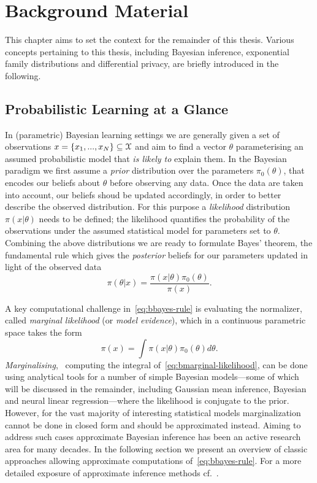 \chapter{Background Material}
\label{chap:chap2}

This chapter aims to set the context for the remainder of this thesis. Various concepts pertaining to this thesis, including Bayesian inference, exponential family distributions and differential privacy, are briefly introduced in the following.

\section{Probabilistic Learning at  a Glance}
\label{sec:b-bayesian-inference}

In (parametric) Bayesian learning settings we are generally given a set of observations $x = \{x_1,...,x_N\} \subseteq \mathcal{X}$ and aim to find a vector $\theta $ parameterising an assumed probabilistic model that \emph{is likely to} explain them. In the Bayesian paradigm we first assume a \emph{prior} distribution over the parameters $\pi_0(\theta)$, that encodes our beliefs about $\theta$ before observing any data. Once the data are taken into account, our beliefs shoud be updated accordingly, in order to better describe the observed distribution. For this purpose a \emph{likelihood} distribution $\pi(x|\theta)$ needs to be defined; the likelihood quantifies the probability of the observations under the assumed statistical model for parameters set to $\theta$. Combining the above distributions we are ready to formulate Bayes' theorem, the fundamental rule which gives the \emph{posterior} beliefs for our parameters updated in light of the observed data
\[
\pi(\theta|x) = \frac{\pi(x|\theta)\pi_0(\theta)}{\pi(x)}.
\label{eq:bbayes-rule}
\] 

A key computational challenge in~\cref{eq:bbayes-rule} is evaluating the normalizer, called \emph{marginal likelihood} (or \emph{model evidence}), which in a continuous parametric space takes the form
\[
\pi(x) = \int \pi(x|\theta) \pi_0(\theta) d\theta.
\label{eq:bmarginal-likelihood}
\]
\emph{Marginalising}, \ie~computing the integral of~\cref{eq:bmarginal-likelihood}, can be done using analytical tools for a number of simple Bayesian models---some of which will be discussed in the remainder, including Gaussian mean inference, Bayesian and neural linear regression---where the likelihood is conjugate to the prior. However, for the vast majority of interesting statistical models marginalization cannot be done in closed form and should be approximated instead. Aiming to address such cases approximate Bayesian inference has been an active research area for many decades. In the following section we present an overview of classic approaches allowing approximate computations of~\cref{eq:bbayes-rule}. For a more detailed exposure of approximate inference methods cf.~\citep{bishop06,murphy12,angelino16}.

